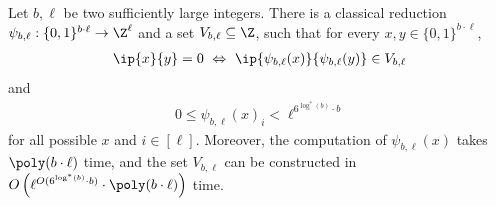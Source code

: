 \begin{theorem}[{\cite[Theorem 4.1]{r17}}]\label{thm:zov_map}
Let $b,\ell$ be two sufficiently large integers. There is a classical reduction $\psi_{b,\ell}:\{0,1\}^{b\cdot\ell}\rightarrow \Z^\ell$ and a set $V_{b,\ell}\subseteq \Z$, such that for every $x,y\in \{0,1\}^{b\cdot \ell}$,
\begin{align}\label{eq:zov_iff}
    \ip{x}{y}=0~\Leftrightarrow~\ip{\psi_{b,\ell}(x)}{\psi_{b,\ell}(y)}\in V_{b,\ell}
\end{align}
and
\begin{align}
    0\leq \psi_{b,\ell}(x)_i< \ell^{6^{\log^* (b)}\cdot b}
\end{align}
for all possible $x$ and $i\in [\ell]$. Moreover, the computation of $\psi_{b,\ell}(x)$ takes $\poly(b\cdot \ell)$ time, and the set $V_{b,\ell}$ can be constructed in $O\left( \ell^{O(6^{\log^* (b)}\cdot b)}\cdot \poly(b\cdot \ell) \right)$ time.
\end{theorem}

